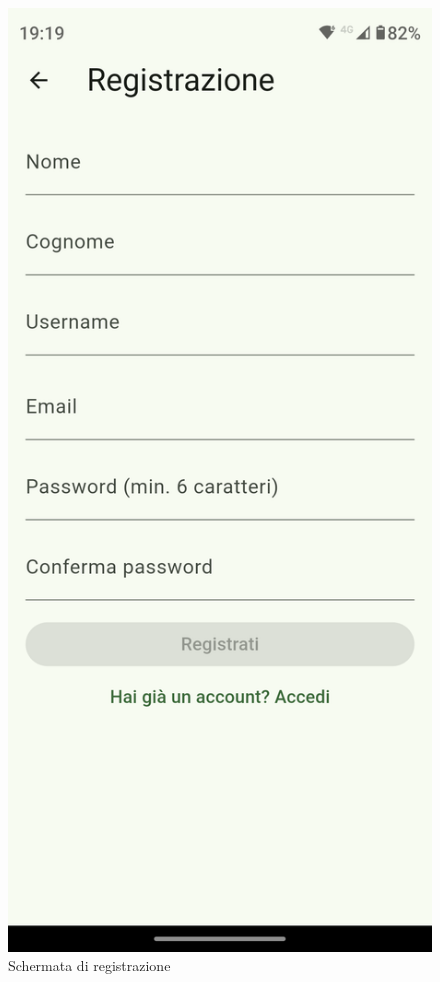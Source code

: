 \documentclass{article}
\begin{document}
\begin{figure}[H]
  \centering
  \includegraphics[width=0.6\linewidth]{register-f.png}
  \caption{Schermata di registrazione}
  \label{fig:sitemap}
\end{figure}
\end{document}
